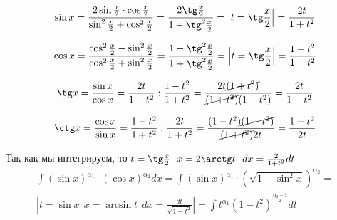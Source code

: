 \[
  \sin x = \frac{2\sin \frac{x}{2} \cdot \cos \frac{x}{2}}{\sin^2 \frac{x}{2}
  + \cos^2 \frac{x}{2}} = \frac{2\tg \frac{x}{2}}{1 + \tg^2 \frac{x}{2}} =
  \left| t = \tg \frac{x}{2} \right| = \frac{2t}{1+t^2}
\]

\[
  \cos x = \frac{\cos^2 \frac{x}{2} - \sin^2 \frac{x}{2}}
  {\cos^2 \frac{x}{2} + \sin^2 \frac{x}{2}} =
  \frac{1 - \tg^2 \frac{x}{2}}{1 + \tg^2 \frac{x}{2}} =
  \left| t = \tg \frac{x}{2} \right| =
  \frac{1 - t^2}{1 + t^2}
\]

\[
  \tg x = \frac{\sin x}{\cos x} = \frac{2t}{1+t^2} : \frac{1-t^2}{1+t^2} =
  \frac{2t \cancel{(1+t^2)}}{\cancel{(1+t^2)} (1-t^2)} = \frac{2t}{1-t^2}
\]

\[
  \ctg x = \frac{\cos x}{\sin x} = \frac{1-t^2}{1+t^2} : \frac{2t}{1+t^2} =
  \frac{(1-t^2) \cancel{(1+t^2)}}{\cancel{(1+t^2)} 2t} = \frac{1-t^2}{2t}
\]

Так как мы интегрируем, то $t = \tg \frac{x}{2} ~~ x = 2\arctg t ~~
  dx = \frac{2}{1+t^2}dt$
\begin{eqnarray*}
  \int (\sin x)^{\alpha_1} \cdot (\cos x)^{\alpha_2} dx =
  \int (\sin x)^{\alpha_1} \cdot (\sqrt{1 - \sin^2 x})^{\alpha_2} = \\
  \left| t = \sin x ~~ x = \arcsin t ~~ dx = \frac{dt}{\sqrt{1-t^2}} \right| =
  \int t^{\alpha_1}(1-t^2)^{\frac{\alpha_2 - 1}{2}} dt
\end{eqnarray*}